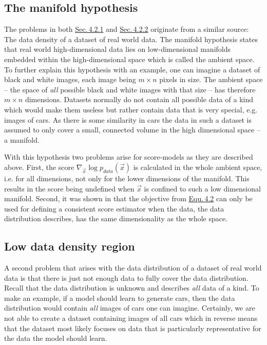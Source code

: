\subsection{The manifold hypothesis} \label{sec:4.2.1}
The problems in both \hyperref[sec:4.2.1]{Sec.\,4.2.1} and \hyperref[sec:4.2.2]{Sec.\,4.2.2} originate from a similar source: The data density of a dataset of real world data. The manifold hypothesis states that real world high-dimensional data lies on low-dimensional manifolds embedded within the high-dimensional space which is called the ambient space. To further explain this hypothesis with an example, one can imagine a dataset of black and white images, each image being $m\times n$ pixels in size. The ambient space – the space of \textit{all} possible black and white images with that size – has therefore $m\times n$ dimensions. Datasets normally do not contain all possible data of a kind which would make them useless but rather contain data that is very special, e.g. images of cars. As there is some similarity in cars the data in such a dataset is assumed to only cover a small, connected volume in the high dimensional space – a manifold. 

With this hypothesis two problems arise for score-models as they are described above. First, the score $\nabla_{\vec{x}}\log p_{data}(\vec{x})$ is calculated in the whole ambient space, i.e. for all dimensions, not only for the lower dimensions of the manifold. This results in the score being undefined when $\vec{x}$ is confined to such a low dimensional manifold. Second, it was shown in \cite{score_matching_original} that the objective from \hyperref[equ:4.2]{Equ.\,4.2} can only be used for defining a consistent score estimator when the data, the data distribution describes, has the same dimensionality as the whole space.
%
\subsection{Low data density region}\label{sec:4.2.2}
A second problem that arises with the data distribution of a dataset of real world data is that there is just not enough data to fully cover the data distribution. Recall that the data distribution is unknown and describes \textit{all} data of a kind. To make an example, if a model should learn to generate cars, then the data distribution would contain \textit{all} images of cars one can imagine. Certainly, we are not able to create a dataset containing images of all cars which in reverse means that the dataset most likely focuses on data that is particularly representative for the data the model should learn.


